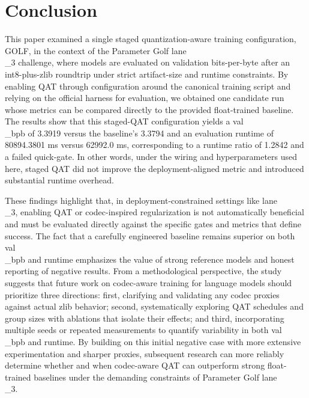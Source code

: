 \documentclass{article}
\begin{document}
\section{Conclusion}

\label{sec:conclusion}

This paper examined a single staged quantization-aware training configuration, GOLF, in the context of the Parameter Golf lane\\_3 challenge, where models are evaluated on validation bits-per-byte after an int8-plus-zlib roundtrip under strict artifact-size and runtime constraints. By enabling QAT through configuration around the canonical training script and relying on the official harness for evaluation, we obtained one candidate run whose metrics can be compared directly to the provided float-trained baseline. The results show that this staged-QAT configuration yields a val\\_bpb of 3.3919 versus the baseline's 3.3794 and an evaluation runtime of 80894.3801 ms versus 62992.0 ms, corresponding to a runtime ratio of 1.2842 and a failed quick-gate. In other words, under the wiring and hyperparameters used here, staged QAT did not improve the deployment-aligned metric and introduced substantial runtime overhead.

These findings highlight that, in deployment-constrained settings like lane\\_3, enabling QAT or codec-inspired regularization is not automatically beneficial and must be evaluated directly against the specific gates and metrics that define success. The fact that a carefully engineered baseline remains superior on both val\\_bpb and runtime emphasizes the value of strong reference models and honest reporting of negative results. From a methodological perspective, the study suggests that future work on codec-aware training for language models should prioritize three directions: first, clarifying and validating any codec proxies against actual zlib behavior; second, systematically exploring QAT schedules and group sizes with ablations that isolate their effects; and third, incorporating multiple seeds or repeated measurements to quantify variability in both val\\_bpb and runtime. By building on this initial negative case with more extensive experimentation and sharper proxies, subsequent research can more reliably determine whether and when codec-aware QAT can outperform strong float-trained baselines under the demanding constraints of Parameter Golf lane\\_3.



\end{document}
